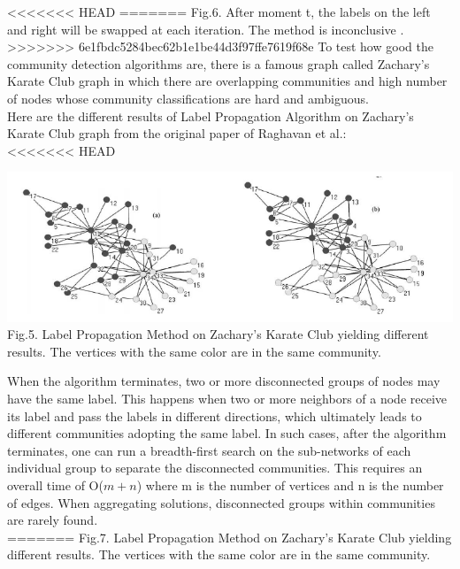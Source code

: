 \documentclass[10pt]{article}
\begin{document}
<<<<<<< HEAD
=======
 Fig.6. After moment t, the labels on the left and right will be swapped at each iteration. The method is inconclusive \cite{raghavan}. \\

>>>>>>> 6e1fbdc5284bec62b1e1be44d3f97ffe7619f68e
To test how good the community detection algorithms are, there is a famous graph called Zachary’s Karate Club graph in which there are overlapping communities and high number of nodes whose community classifications are hard and ambiguous. \\

Here are the different results of Label Propagation Algorithm on Zachary’s Karate Club graph from the original paper of Raghavan et al.: \\

<<<<<<< HEAD
\begin{center}
    \includegraphics[scale=0.5]{labelPropKarateClub.png} \\
    Fig.5. Label Propagation Method on Zachary’s Karate Club yielding different results. The vertices with the same color are in the same community\cite{raghavan}.
\end{center}


When the algorithm terminates, two or more disconnected groups of nodes may have the same label. This happens when two or more neighbors of a node receive its label and pass the labels in different directions, which ultimately leads to different communities adopting the same label. In such cases, after the algorithm terminates, one can run a breadth-first search on the sub-networks of each individual group to separate the disconnected communities. This requires an overall time of O($m+n$) where m is the number of vertices and n is the number of edges. When aggregating solutions, disconnected groups within communities are rarely found. \\
=======
  Fig.7. Label Propagation Method on Zachary’s Karate Club yielding different results. The vertices with the same color are in the same community\cite{raghavan}. \\
\end{document}
